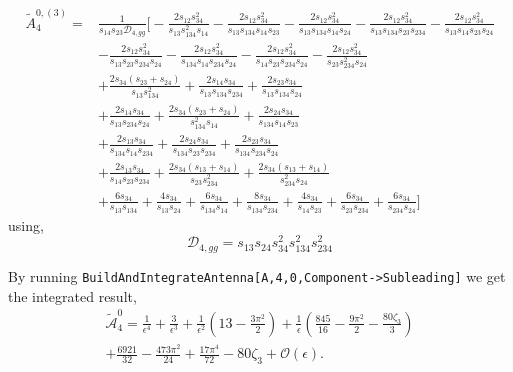 \begin{align}
\tilde A_4^{0,(3)} = {}
& \frac{1}{s_{14}s_{23}\mathcal D_{4,gg}}\Bigg[-\frac{2s_{12}s_{34}^{2}}
{s_{13}s_{134}^{2}s_{14}}
-\frac{2s_{12}s_{34}^{2}}
{s_{13}s_{134}s_{14}s_{23}}
-\frac{2s_{12}s_{34}^{2}}
{s_{13}s_{134}s_{14}s_{24}}
-\frac{2s_{12}s_{34}^{2}}
{s_{13}s_{134}s_{23}s_{234}}
-\frac{2s_{12}s_{34}^{2}}
{s_{13}s_{14}s_{23}s_{24}} \nonumber \\
&-\frac{2s_{12}s_{34}^{2}}
{s_{13}s_{23}s_{234}s_{24}}
-\frac{2s_{12}s_{34}^{2}}
{s_{134}s_{14}s_{234}s_{24}}
-\frac{2s_{12}s_{34}^{2}}
{s_{14}s_{23}s_{234}s_{24}}
-\frac{2s_{12}s_{34}^{2}}
{s_{23}s_{234}^{2}s_{24}}
 \nonumber \\[1mm]
&+\frac{2s_{34}(s_{23}+s_{24})}
{s_{13}s_{134}^{2}}
+\frac{2s_{14}s_{34}}
{s_{13}s_{134}s_{234}}
+\frac{2s_{23}s_{34}}
{s_{13}s_{134}s_{24}}
 \nonumber \\
&+\frac{2s_{14}s_{34}}
{s_{13}s_{234}s_{24}}
+\frac{2s_{34}(s_{23}+s_{24})}
{s_{134}^{2}s_{14}}
+\frac{2s_{24}s_{34}}
{s_{134}s_{14}s_{23}}
 \nonumber \\
&+\frac{2s_{13}s_{34}}
{s_{134}s_{14}s_{234}}
+\frac{2s_{24}s_{34}}
{s_{134}s_{23}s_{234}}
+\frac{2s_{23}s_{34}}
{s_{134}s_{234}s_{24}}
 \nonumber \\
&+\frac{2s_{13}s_{34}}
{s_{14}s_{23}s_{234}}
+\frac{2s_{34}(s_{13}+s_{14})}
{s_{23}s_{234}^{2}}
+\frac{2s_{34}(s_{13}+s_{14})}
{s_{234}^{2}s_{24}}
 \nonumber \\[1mm]
&+\frac{6s_{34}}{s_{13}s_{134}}
+\frac{4s_{34}}{s_{13}s_{24}}
+\frac{6s_{34}}{s_{134}s_{14}}
+\frac{8s_{34}}{s_{134}s_{234}}
+\frac{4s_{34}}{s_{14}s_{23}}
+\frac{6s_{34}}{s_{23}s_{234}}
+\frac{6s_{34}}{s_{234}s_{24}}\Bigg]
\end{align}
using,
\begin{equation*}
    \mathcal D_{4,gg} = s_{13}s_{24}s_{34}^2s_{134}^2s_{234}^2
\end{equation*}

By running \texttt{BuildAndIntegrateAntenna[A,4,0,Component->Subleading]} we get the integrated result, 
\begin{equation}
    \begin{gathered}
        \tilde{\mathcal A}_4^0 = \frac1{\epsilon^4}+\frac3{\epsilon^3}+\frac1{\epsilon^2}\!\left(13-\frac{3\pi^2}{2}\right)+\frac1\epsilon\!\left(\frac{845}{16}-\frac{9\pi^2}2-\frac{80\zeta_3}3\right)\\
        +\frac{6921}{32}-\frac{473\pi^2}{24}+\frac{17\pi^4}{72}-80\zeta_3+\mathcal O(\epsilon).
    \end{gathered}
\end{equation}

